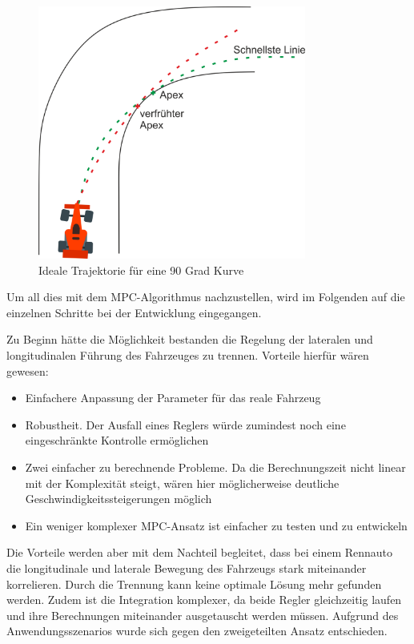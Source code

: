 \documentclass{like}
\begin{document}
\begin{figure}[ht!]
	\centering
	\includegraphics[width=250pt]{Abbildungen/apexTrajektory.png}
	\caption{Ideale Trajektorie für eine 90 Grad Kurve}
	\label{fig:idealTrajektorie}
\end{figure}


Um all dies mit dem \ac{MPC}-Algorithmus nachzustellen, wird im Folgenden auf die einzelnen Schritte bei der Entwicklung eingegangen.

Zu Beginn hätte die Möglichkeit bestanden die Regelung der lateralen und longitudinalen Führung des Fahrzeuges zu trennen. 
Vorteile hierfür wären gewesen:
\begin{itemize}
	\item Einfachere Anpassung der Parameter für das reale Fahrzeug
	\item Robustheit. Der Ausfall eines Reglers würde zumindest noch eine eingeschränkte Kontrolle ermöglichen
	\item Zwei einfacher zu berechnende Probleme. Da die Berechnungszeit nicht linear mit der Komplexität steigt, wären hier möglicherweise deutliche Geschwindigkeitssteigerungen möglich
	\item Ein weniger komplexer \ac{MPC}-Ansatz ist einfacher zu testen und zu entwickeln
\end{itemize}

Die Vorteile werden aber mit dem Nachteil begleitet, dass bei einem Rennauto die longitudinale und laterale Bewegung des Fahrzeugs stark miteinander korrelieren. Durch die Trennung kann keine optimale Lösung mehr gefunden werden. 
Zudem ist die Integration komplexer, da beide Regler gleichzeitig laufen und ihre Berechnungen miteinander ausgetauscht werden müssen.
Aufgrund des Anwendungsszenarios wurde sich gegen den zweigeteilten Ansatz entschieden.
\end{document}
